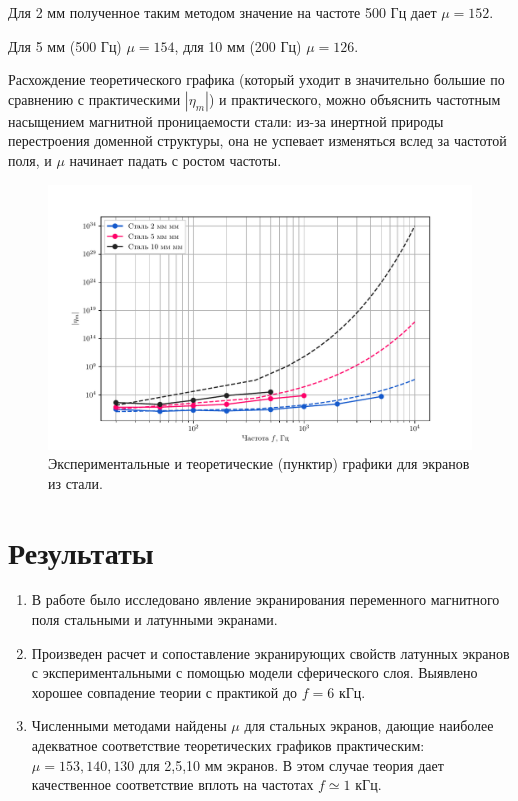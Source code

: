 Для 2 мм полученное таким методом значение на частоте 500 Гц дает $\mu=152$.

Для 5 мм (500 Гц) $\mu=154$, для 10 мм (200 Гц) $\mu=126$.


Расхождение теоретического графика (который уходит в значительно большие по сравнению с практическими $|\eta_m|$)  и
практического, можно объяснить частотным насыщением магнитной проницаемости стали: из-за инертной природы перестроения
доменной структуры, она не успевает изменяться вслед за частотой поля, и $\mu$ начинает падать с ростом частоты.

\begin{figure}[H]
	\vspace{-20pt}
	\centering
	\includegraphics[width=0.95\linewidth]{fig/st}
	\caption{Экспериментальные и теоретические (пунктир) графики для экранов из стали.}
	\label{fig:eta_wt_steel}
\end{figure}
\section{Результаты}
\begin{enumerate}
	\item В работе было исследовано явление экранирования переменного магнитного поля стальными и латунными экранами. 

	\item Произведен расчет и сопоставление экранирующих свойств латунных экранов с экспериментальными с помощью модели сферического слоя. Выявлено хорошее совпадение теории с практикой до $f=6$ кГц. 

	\item Численными методами найдены $\mu$ для стальных экранов, дающие наиболее адекватное соответствие теоретических графиков практическим: $\mu=153,140,130$ для 2,5,10 мм экранов. В этом случае теория дает качественное соответствие вплоть на частотах $f \simeq 1$ кГц.
\end{enumerate}

